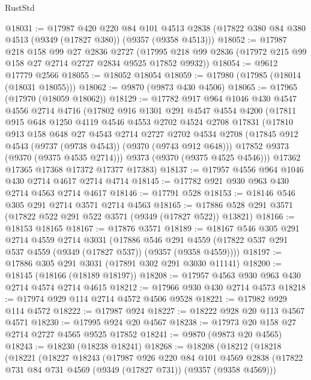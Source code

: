 \begin{lexlean}{RustStd}
\begin{coremodule}
{\begin{coremodule}
{{{{{{{{{{{{{{{{{{{{{{{{{{{{{{{{{{{{{{{@18031 := @17987
    @420
    @220
    @84
    @101
    @4513
    @2838
    (@17822 @380 @84 @380 @4513 (@9349 (@17827 @380)) (@9357 (@9358 @4513)))
@18052 := @17987
    @218
    @158
    @99
    @27
    @2836
    @2727
    (@17995 @218 @99 @2836 (@17972 @215 @99 @158 @27 @2714 @2727 @2834 @9525 @17852 @9932))
@18054 := @9612 @17779 @2566
@18055 := @18052 @18054
@18059 := @17980 (@17985 (@18014 (@18031 @18055)))
@18062 := @9870 (@9873 @430 @4506)
@18065 := @17965 (@17970 (@18059 @18062))
@18129 := @17782
    @917
    @964
    @1046
    @430
    @4547
    @4556
    @2714
    @4716
    (@17802
      @916
      @1301
      @291
      @4547
      @4554
      @4200
      (@17811
        @915
        @648
        @1250
        @4119
        @4546
        @4553
        @2702
        @4524
        @2708
        @17831
        (@17810
          @913
          @158
          @648
          @27
          @4543
          @2714
          @2727
          @2702
          @4534
          @2708
          (@17845 @912 @4543 (@9737 (@9738 @4543)) (@9370 (@9743 @912 @648)))
          @17852
          @9373
          (@9370 (@9375 @4535 @2714)))
        @9373
        (@9370 (@9375 @4525 @4546)))
      @17362
      @17365
      @17368
      @17372
      @17377
      @17383)
@18137 := @17957 @4556 @964 @1046 @430 @2714 @4617 @2714 @4714
@18145 := @17782 @921 @930 @963 @430 @2714 @4563 @2714 @4617
@18146 := @17791 @528
@18153 := @18146 @546 @305 @291 @2714 @3571 @2714 @4563
@18165 := @17886 @528 @291 @3571 (@17822 @522 @291 @522 @3571 (@9349 (@17827 @522)) @13821)
@18166 := @18153 @18165
@18167 := @17876 @3571
@18189 := @18167
    @546
    @305
    @291
    @2714
    @4559
    @2714
    @3031
    (@17886
      @546
      @291
      @4559
      (@17822 @537 @291 @537 @4559 (@9349 (@17827 @537)) (@9357 (@9358 @4559))))
@18197 := @17886 @305 @291 @3031 (@17891 @302 @291 @3030 @11141)
@18200 := @18145 (@18166 (@18189 @18197))
@18208 := @17957 @4563 @930 @963 @430 @2714 @4574 @2714 @4615
@18212 := @17966 @930 @430 @2714 @4573
@18218 := @17974 @929 @114 @2714 @4572 @4506 @9528
@18221 := @17982 @929 @114 @4572
@18222 := @17987 @924
@18227 := @18222 @928 @20 @113 @4567 @4571
@18230 := @17995 @924 @20 @4567
@18238 := @17973 @20 @158 @27 @2714 @2727 @4565 @9525 @17852
@18241 := @9870 (@9873 @20 @4565)
@18243 := @18230 (@18238 @18241)
@18268 := @18208
    (@18212
      (@18218
        (@18221
          (@18227
            @18243
            (@17987
              @926
              @220
              @84
              @101
              @4569
              @2838
              (@17822 @731 @84 @731 @4569 (@9349 (@17827 @731)) (@9357 (@9358 @4569)))
}}}}}}}}}}}}}}}}}}}}}}}}}}}}}}}}}}}}}}}
\end{coremodule}}
\end{coremodule}
\end{lexlean}

